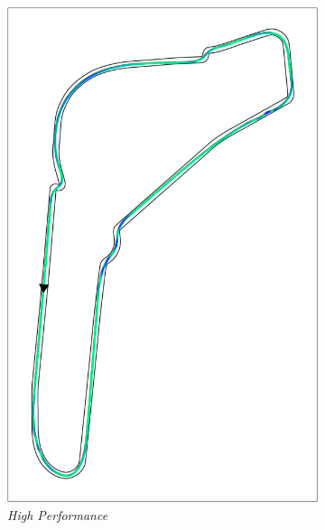 \begin{figure}[H]
    \centering
    \begin{subfigure}[b]{0.3\textwidth}
        \centering
        \includegraphics[width=\textwidth]{images/monza_mpc_hp_crosstrack.png} 
        \caption{\textit{High Performance}}
        \label{fig:tracking_hp_monza}
    \end{subfigure}
    \hfill
    \begin{subfigure}[b]{0.3\textwidth}
        \centering

\end{subfigure}
\end{figure}
